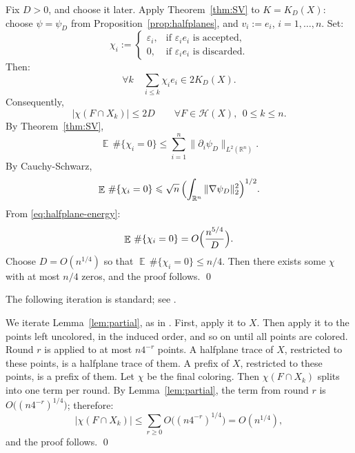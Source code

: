 \documentclass[12pt,reqno]{amsart}
\makeatletter
\def\le{\leqslant}
\def\ge{\geqslant}\def\geq{\geqslant}
\def\le{\leqslant}
\theoremstyle{remark}
\renewenvironment{proof}[1][\proofname]{%
  \par\vspace{\topsep}%
  \normalfont\topsep6\p@\@plus6\p@\relax
  \trivlist
  \item[\hskip\labelsep\itshape #1\@addpunct{.}]\ignorespaces
}{%
  \endtrivlist
}
\numberwithin{equation}{section}
\DeclareMathOperator{\E}{\mathbb{E}}
\def \R {\mathbb{R}}
\def \e {\varepsilon}
\makeatother
\begin{document}
\begin{proof}
Fix \(D>0\), and choose 
it later. Apply Theorem~\ref{thm:SV} to \(K=K_D(X)\): choose \(\psi=\psi_D\) from Proposition~\ref{prop:halfplanes}, and \(v_i:=e_i\), \(i=1,\ldots,n\). Set:
\[
\chi_i:=\begin{cases}
\e_i, & \text{if \(\e_ie_i\) is accepted},\\
0, & \text{if \(\e_ie_i\) is discarded}.
\end{cases}
\]
Then:
\[
\forall k\quad \sum_{i\le k}\chi_ie_i\in2K_D(X).
\]
Consequently,
\begin{equation}\label{eq:partial-prefix}
|\chi(F\cap X_k)|\le2D\qquad\forall F\in\mathcal H(X),\ \ 0\le k\le n.
\end{equation}
By Theorem~\ref{thm:SV},
\[
\E\,\#\{\chi_i=0\}
\le\sum_{i=1}^n\|\partial_i\psi_D\|_{L^2(\R^n)}.
\]
By Cauchy-Schwarz,
\[
\E\,\#\{\chi_i=0\}
\le \sqrt n\,\Bigl(\int_{\R^n}\|\nabla\psi_D\|_2^2\Bigr)^{1/2}.
\]
From \eqref{eq:halfplane-energy}:
\[
\E\,\#\{\chi_i=0\} =O\Bigl(\frac{n^{5/4}}{D}\Bigr).
\]
Choose \(D=O(n^{1/4})\) so that 
\(\E\,\#\{\chi_i=0\}\le n/4\). Then there exists some \(\chi\) with at most \(n/4\) zeros, and the proof follows. \qed
\end{proof}
\smallskip%

\begin{proof}[Proof of Theorem~\ref{thm:prefix}]
The following iteration is standard; see \cite{Spencer-6}. 
\smallskip%

We iterate Lemma~\ref{lem:partial}, as in 
\cite[\S\,2]{Versh-Sm-4}. First, apply it to \(X\). 
Then apply it to the points left uncolored, in the induced order, and so on until all points are colored. Round \(r\) is applied to at most \(n4^{-r}\) points. A halfplane trace of \(X\), restricted to these points, is a halfplane trace of them. A prefix of \(X\), restricted to these points, 
is a prefix of them. Let \(\chi\) be the 
final coloring. Then \(\chi(F\cap X_k)\) splits into one term per round. By Lemma~\ref{lem:partial}, the term from round \(r\) is \(O\bigl((n4^{-r})^{1/4}\bigr)\); therefore:
\[
|\chi(F\cap X_k)|\le\sum_{r\ge0}O\bigl((n4^{-r})^{1/4}\bigr)=O(n^{1/4}),
\]
and the proof follows. \qed
\end{proof}
\end{document}
